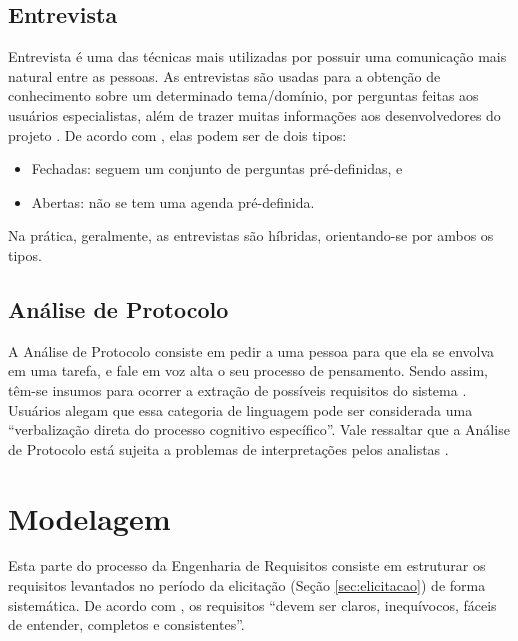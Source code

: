 \subsection{Entrevista}

\label{sec:entrevista}

Entrevista é uma das técnicas mais utilizadas por possuir uma comunicação mais natural entre as pessoas. As entrevistas são usadas para a obtenção de conhecimento sobre um determinado tema/domínio, por perguntas feitas aos usuários especialistas, além de trazer muitas informações aos desenvolvedores do projeto \cite{batista2003taxonomia}. De acordo com , elas podem ser de dois tipos:
\begin{itemize}
    \item Fechadas: seguem um conjunto de perguntas pré-definidas, e
    \item Abertas: não se tem uma agenda pré-definida.
\end{itemize}
Na prática, geralmente, as entrevistas são híbridas, orientando-se por ambos os tipos.

\subsection{Análise de Protocolo}

\label{sec:analise-protocolo}

A Análise de Protocolo consiste em pedir a uma pessoa para que ela se envolva em uma tarefa, e fale em voz alta o seu processo de pensamento. Sendo assim, têm-se insumos para ocorrer a extração de possíveis requisitos do sistema \cite{goguen1993techniques}. Usuários alegam que essa categoria de linguagem pode ser considerada uma “verbalização direta do processo cognitivo específico”. Vale ressaltar que a Análise de Protocolo está sujeita a problemas de interpretações pelos analistas \cite{belgamo2000estudo}.

\section {Modelagem}

\label{sec:modelagem}

Esta parte do processo da Engenharia de Requisitos consiste em estruturar os requisitos levantados no período da elicitação (Seção \ref{sec:elicitacao}) de forma sistemática. De acordo com , os requisitos “devem ser claros, inequívocos, fáceis de entender, completos e consistentes”.

